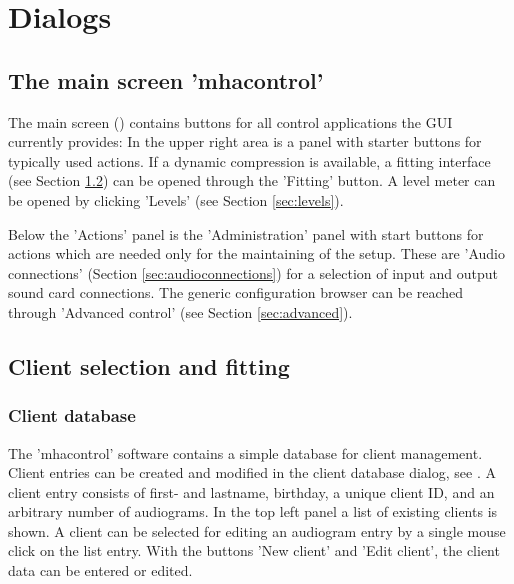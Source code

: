 \documentclass[11pt,a4paper,twoside]{article}
\newcommand{\+}{\discretionary{\mbox{\scriptsize$\hookleftarrow$}}{}{}}
\begin{document}
\section{Dialogs}

\subsection{The main screen 'mhacontrol'}

The main screen () contains buttons for all control applications the GUI currently provides:
%
In the upper right area is a panel with starter buttons for typically
used actions.
%
If a dynamic compression is available, a fitting interface (see
Section \ref{sec:fitting}) can be opened through the 'Fitting' button.
%
A level meter can be opened by clicking 'Levels' (see Section
\ref{sec:levels}).

Below the 'Actions' panel is the 'Administration'
panel with start buttons for actions which are
needed only for the maintaining of the \mha{} setup.
%
These are 'Audio connections' (Section \ref{sec:audioconnections}) for
a selection of input and output sound card connections.
%
The generic \mha{} configuration browser can be reached through 'Advanced
control' (see Section \ref{sec:advanced}).


\subsection{Client selection and fitting}\label{sec:fitting}

\subsubsection*{Client database}

The 'mhacontrol' software contains a simple database for client management.
%
Client entries can be created and modified in the client database
dialog, see .
%
A client entry consists of first- and lastname, birthday, a unique
client ID, and an arbitrary number of
audiograms.
%
In the top left panel a list of existing clients is shown.
%
A client can be selected for editing an audiogram entry by a single
mouse click on the list entry.
%
With the buttons 'New client' and 'Edit client', the client data can
be entered or edited.
\end{document}
